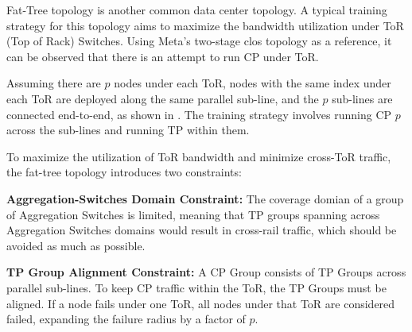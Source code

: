     
  

Fat-Tree topology is another common data center topology. A typical training strategy for this topology aims to maximize the bandwidth utilization under ToR (Top of Rack) Switches. Using Meta's two-stage clos topology\cite{sigcomm2024meta} as a reference, it can be observed that there is an attempt to run CP under ToR.

 Assuming there are $p$ nodes under each ToR, nodes with the same index under each ToR are deployed along the same parallel sub-line, and the $p$ sub-lines are connected end-to-end, as shown in . The training strategy involves running CP $p$ across the sub-lines and running TP within them.

To maximize the utilization of ToR bandwidth and minimize cross-ToR traffic, the fat-tree topology introduces two constraints:

\begin{packeditemize}
    \item {
        \textbf{Aggregation-Switches Domain Constraint: }The coverage domian of a group of Aggregation Switches is limited, meaning that TP groups spanning across Aggregation Switches domains would result in cross-rail traffic, which should be avoided as much as possible.
    }
    \item {
        \textbf{TP Group Alignment Constraint: } A CP Group consists of TP Groups across parallel sub-lines. To keep CP traffic within the ToR, the TP Groups must be aligned. If a node fails under one ToR, all nodes under that ToR are considered failed, expanding the failure radius by a factor of $p$. 
    }
\end{packeditemize}

